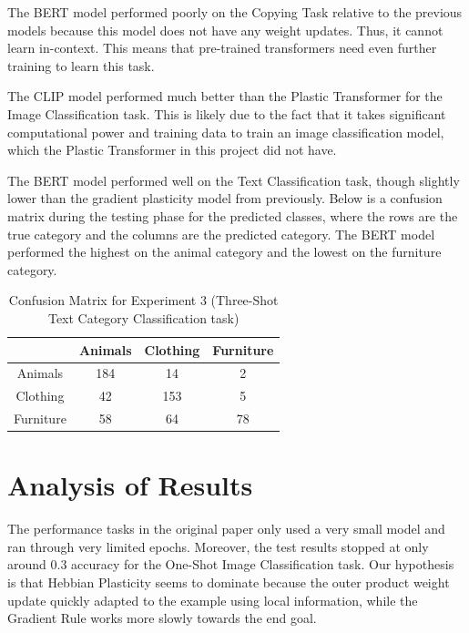 \documentclass{article}
\begin{document}
The BERT model performed poorly on the Copying Task relative to the previous models because this model does not have any weight updates. Thus, it cannot learn in-context. This means that pre-trained transformers need even further training to learn this task.

The CLIP model performed much better than the Plastic Transformer for the Image Classification task. This is likely due to the fact that it takes significant computational power and training data to train an image classification model, which the Plastic Transformer in this project did not have. 

The BERT model performed well on the Text Classification task, though slightly lower than the gradient plasticity model from previously. Below is a confusion matrix during the testing phase for the predicted classes, where the rows are the true category and the columns are the predicted category. The BERT model performed the highest on the animal category and the lowest on the furniture category.

\begin{table}[h!]
    \centering
    \begin{tabular}{|c|c|c|c|}
        \hline
           & Animals & Clothing & Furniture\\
        \hline
       Animals & 184 & 14 & 2\\
       \hline
       Clothing & 42 & 153 & 5\\
       \hline
       Furniture & 58 & 64 & 78 \\
        \hline
    \end{tabular}
    \caption{Confusion Matrix for Experiment 3 (Three-Shot Text Category Classification task)}
    \label{tab:pre_trained results}
\end{table}



\section{Analysis of Results}

The performance tasks in the original paper only used a very small model and ran through very limited epochs. Moreover, the test results stopped at only around 0.3 accuracy for the One-Shot Image Classification task. Our hypothesis is that Hebbian Plasticity seems to dominate because the outer product weight update quickly adapted to the example using local information, while the Gradient Rule works more slowly towards the end goal.
\end{document}

